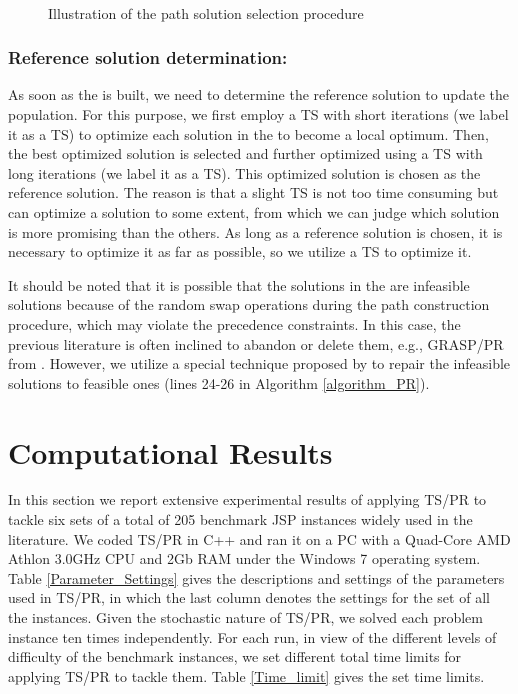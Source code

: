 \documentclass[authoryear,12pt]{elsarticle}
\begin{document}
\begin{figure}[!htbp]
  \centering{}\\
  \centering\caption{Illustration of the path solution selection procedure}\label{fig_solutionselection}
\end{figure}

\subsubsection{Reference solution determination:}
\label{subsubsec_ref_solution}

As soon as the  is built, we need to determine the reference solution to update the population. For this purpose, we first employ a TS with short iterations (we label it as a  TS) to optimize each solution in the  to become a local optimum. Then, the best optimized solution is selected and further optimized using a TS with long iterations (we label it as a  TS). This optimized solution is chosen as the reference solution. The reason is that a slight TS is not too time consuming but can optimize a solution to some extent, from which we can judge which solution is more promising than the others. As long as a reference solution is chosen, it is necessary to optimize it as far as possible, so we utilize a  TS to optimize it.

It should be noted that it is possible that the solutions in the  are infeasible solutions because of the random swap operations during the path construction procedure, which may violate the precedence constraints. In this case, the previous literature is often inclined to abandon or delete them, e.g., GRASP/PR from \cite{Aiex2003GRASPwithPR}. However, we utilize a special technique proposed by \cite{Qing-dao-er-ji2012HGA} to repair the infeasible solutions to feasible ones (lines 24-26 in Algorithm \ref{algorithm_PR}).


\section{Computational Results}
\label{sec results Experiment3}


In this section we report extensive experimental results of applying TS/PR to tackle six sets of a total of 205 benchmark JSP instances widely used in the literature. We coded TS/PR in C++ and ran it on a PC with a Quad-Core AMD Athlon 3.0GHz CPU and 2Gb RAM under the Windows 7 operating system. Table \ref{Parameter_Settings} gives the descriptions and settings of the parameters used in TS/PR, in which the last column denotes the settings for the set of all the instances. Given the stochastic nature of TS/PR, we solved each problem instance ten times independently. For each run, in view of the different levels of difficulty of the benchmark instances, we set different total time limits for applying TS/PR to tackle them. Table \ref{Time_limit} gives the set time limits.
\end{document}
